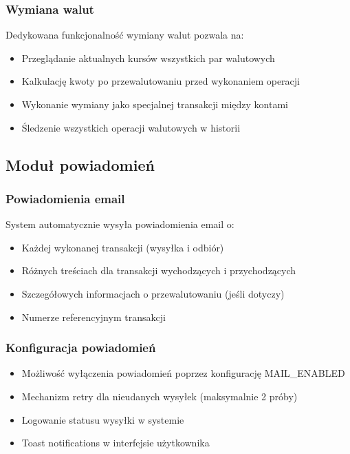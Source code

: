 \documentclass[12pt,a4paper]{article}
\begin{document}
    \subsubsection{Wymiana walut}
    Dedykowana funkcjonalność wymiany walut pozwala na:
    \begin{itemize}
        \item Przeglądanie aktualnych kursów wszystkich par walutowych
        \item Kalkulację kwoty po przewalutowaniu przed wykonaniem operacji
        \item Wykonanie wymiany jako specjalnej transakcji między kontami
        \item Śledzenie wszystkich operacji walutowych w historii
    \end{itemize}

    \subsection{Moduł powiadomień}

    \subsubsection{Powiadomienia email}
    System automatycznie wysyła powiadomienia email o:
    \begin{itemize}
        \item Każdej wykonanej transakcji (wysyłka i odbiór)
        \item Różnych treściach dla transakcji wychodzących i przychodzących
        \item Szczegółowych informacjach o przewalutowaniu (jeśli dotyczy)
        \item Numerze referencyjnym transakcji
    \end{itemize}

    \subsubsection{Konfiguracja powiadomień}
    \begin{itemize}
        \item Możliwość wyłączenia powiadomień poprzez konfigurację MAIL\_ENABLED
        \item Mechanizm retry dla nieudanych wysyłek (maksymalnie 2 próby)
        \item Logowanie statusu wysyłki w systemie
        \item Toast notifications w interfejsie użytkownika
    \end{itemize}
\end{document}
